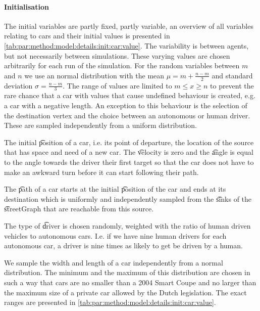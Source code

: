 \paragraph{Initialisation}
\label{par:method:model:details:initialization}
The initial variables are partly fixed, partly variable, an overview of all variables relating to cars and their initial values is presented in \cref{tab:par:method:model:details:init:car:value}. The variability is between agents, but not necessarily between simulations. These varying values are chosen arbitrarily for each run of the simulation.
For the random variables between $m$ and $n$ we use an normal distribution with the mean $\mu=m+\frac{n-m}{2}$ and standard deviation $\sigma=\frac{n-m}{3}$. The range of values are limited to $m \leq x \geq n$ to prevent the rare chance that a car with values that cause undefined behaviour is created, e.g. a car with a negative length.
An exception to this behaviour is the selection of the destination vertex and the choice between an autonomous or human driver. These are sampled independently from a uniform distribution.


The initial \t{position} of a car, i.e. its point of departure, the location of the source that has space and need of a new car. The \t{velocity} is zero and the \t{angle} is equal to the angle towards the driver their first target so that the car does not have to make an awkward turn before it can start following their path.

The \t{path} of a car starts at the initial \t{position} of the car and ends at its destination which is uniformly and independently sampled from the \t{sinks} of the \t{streetGraph} that are reachable from this source.

The type of \t{driver} is chosen randomly, weighted with the ratio of human driven vehicles to autonomous cars. I.e. if we have nine human drivers for each autonomous car, a driver is nine times as likely to get be driven by a human.

We sample the width and length of a car independently from a normal distribution. The minimum and the maximum of this distribution are chosen in such a way that cars are no smaller than a 2004 Smart Coupe and no larger than the maximum size of a private car allowed by the Dutch legislation. The exact ranges are presented in \cref{tab:par:method:model:details:init:car:value}.

